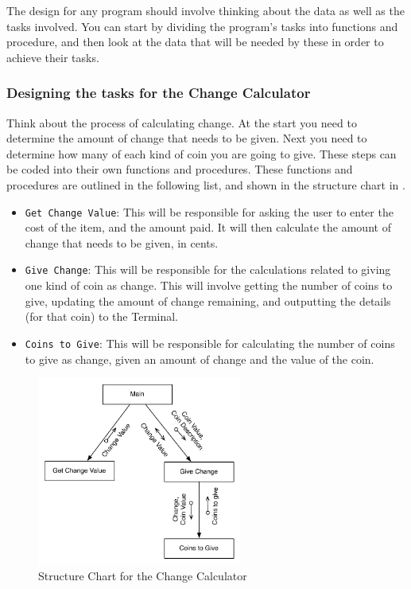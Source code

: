 The design for any program should involve thinking about the data as well as the tasks involved. You can start by dividing the program's tasks into functions and procedure, and then look at the data that will be needed by these in order to achieve their tasks.

\subsubsection{Designing the tasks for the Change Calculator} %
\label{ssub:designing_the_tasks_for_the_change_calculator}

Think about the process of calculating change. At the start you need to determine the amount of change that needs to be given. Next you need to determine how many of each kind of coin you are going to give. These steps can be coded into their own functions and procedures. These functions and procedures are outlined in the following list, and shown in the structure chart in .

\begin{itemize}
  \item \texttt{Get Change Value}: This  will be responsible for asking the user to enter the cost of the item, and the amount paid. It will then calculate the amount of change that needs to be given, in cents.
  \item \texttt{Give Change}: This  will be responsible for the calculations related to giving one kind of coin as change. This will involve getting the number of coins to give, updating the amount of change remaining, and outputting the details (for that coin) to the Terminal.
  \item \texttt{Coins to Give}: This  will be responsible for calculating the number of coins to give as change, given an amount of change and the value of the coin.
\end{itemize}

\begin{figure}[htbp]
   \centering
   \includegraphics[width=0.6\textwidth]{./topics/storing-using-data/images/SimpleCalcStructure} 
   \caption{Structure Chart for the Change Calculator}
   \label{fig:simple-change-structure}
\end{figure}

